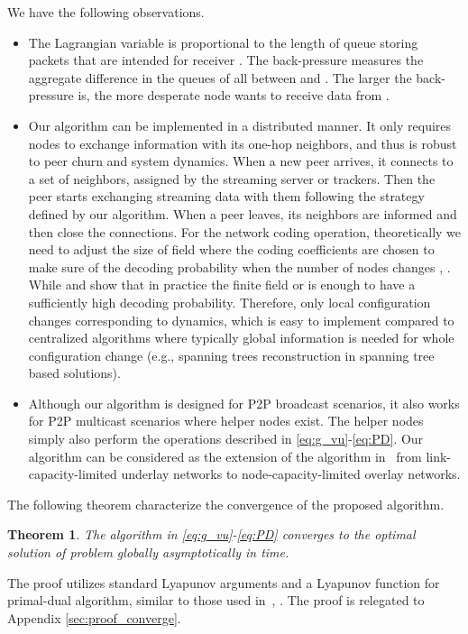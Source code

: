 \documentclass[10pt,conference]{IEEEtran}
\newtheorem{theorem}{\bf Theorem}
\begin{document}
We have the following observations.
\begin{itemize}
\item The Lagrangian variable  is proportional to the length
of queue storing packets that are intended for receiver . The
back-pressure  measures the aggregate difference in the queues
of all  between  and . The larger the back-pressure is, the
more desperate node  wants to receive data from .
\item Our algorithm can be implemented in a distributed manner. It only
requires nodes to exchange information with its one-hop neighbors,
and thus is robust to peer churn and system dynamics. When a new peer arrives,
it connects to a set of neighbors, assigned by the streaming server or trackers. Then the peer starts exchanging streaming data with them following the strategy defined by our algorithm. When a peer leaves, its neighbors are informed and then close the connections. For the network coding operation, theoretically we need to adjust the size of field where the coding coefficients are chosen to make sure of the decoding probability when the number of nodes changes \cite{all:article:HMKKESL04}, \cite{all:RandomNC:SET03}. While \cite{chou2003practical} and \cite{wang2007r} show that in practice the finite field  or  is enough to have a sufficiently high decoding probability. Therefore, only local
configuration changes corresponding to dynamics, which is easy to implement
compared to centralized algorithms where typically global information is needed for whole configuration change (e.g., spanning trees reconstruction in spanning tree based solutions).
\item Although our algorithm is designed for P2P broadcast scenarios, it
also works for P2P multicast scenarios where helper nodes exist. The
helper nodes simply also perform the operations described in
\eqref{eq:g_vu}-\eqref{eq:PD}. Our algorithm can be considered as
the extension of the algorithm in~\cite{ho2009dynamic} from
link-capacity-limited underlay networks to node-capacity-limited
overlay networks.
\end{itemize}

The following theorem characterize the convergence of the proposed algorithm.
\begin{theorem}\label{thm:converge}
The algorithm in \eqref{eq:g_vu}-\eqref{eq:PD} converges to the optimal solution of problem 
globally asymptotically in time.
\end{theorem}
The proof utilizes standard Lyapunov arguments and a Lyapunov function for primal-dual algorithm, similar to those used
in~\cite{chen2008ump}, \cite{all:mathematics.cong.ctrl}. The proof is relegated to Appendix \ref{sec:proof_converge}.
\end{document}

